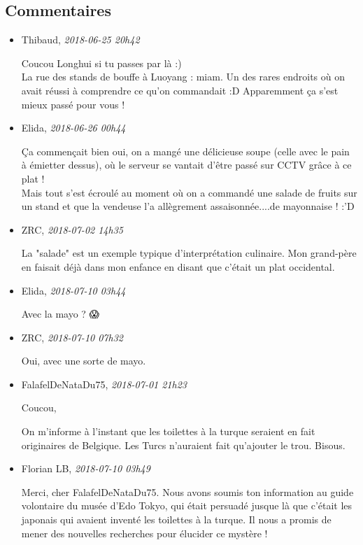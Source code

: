 \hypertarget{commentaires}{%
\subsection{Commentaires}\label{commentaires}}

\begin{itemize}
\item
  Thibaud, \emph{2018-06-25 20h42}

  Coucou Longhui si tu passes par là :)\\
  La rue des stands de bouffe à Luoyang : miam. Un des rares endroits où
  on avait réussi à comprendre ce qu'on commandait :D Apparemment ça
  s'est mieux passé pour vous !
\item
  Elida, \emph{2018-06-26 00h44}

  Ça commençait bien oui, on a mangé une délicieuse soupe (celle avec le
  pain à émietter dessus), où le serveur se vantait d'être passé sur
  CCTV grâce à ce plat !\\
  Mais tout s'est écroulé au moment où on a commandé une salade de
  fruits sur un stand et que la vendeuse l'a allègrement
  assaisonnée....de mayonnaise ! :'D
\item
  ZRC, \emph{2018-07-02 14h35}

  La "salade" est un exemple typique d'interprétation culinaire. Mon
  grand-père en faisait déjà dans mon enfance en disant que c'était un
  plat occidental.
\item
  Elida, \emph{2018-07-10 03h44}

  Avec la mayo ? 😱
\item
  ZRC, \emph{2018-07-10 07h32}

  Oui, avec une sorte de mayo.
\item
  FalafelDeNataDu75, \emph{2018-07-01 21h23}

  Coucou,

  On m'informe à l'instant que les toilettes à la turque seraient en
  fait originaires de Belgique. Les Turcs n'auraient fait qu'ajouter le
  trou. Bisous.
\item
  Florian LB, \emph{2018-07-10 03h49}

  Merci, cher FalafelDeNataDu75. Nous avons soumis ton information au
  guide volontaire du musée d'Edo Tokyo, qui était persuadé jusque là
  que c'était les japonais qui avaient inventé les toilettes à la
  turque. Il nous a promis de mener des nouvelles recherches pour
  élucider ce mystère !
\end{itemize}
